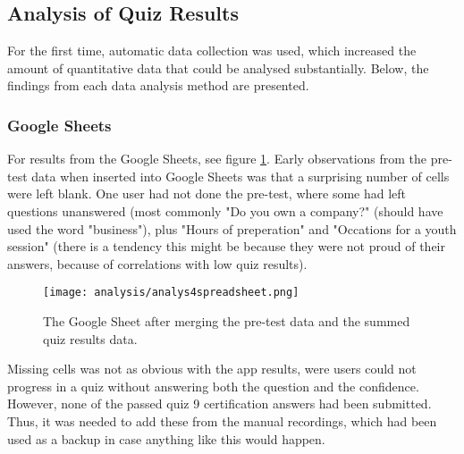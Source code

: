 \subsection{Analysis of Quiz Results}






For the first time, automatic data collection was used, which increased the amount of quantitative data that could be analysed substantially. Below, the findings from each data analysis method are presented.

\subsubsection{Google Sheets}
For results from the Google Sheets, see figure \ref{fig:analysFarg3}. Early observations from the pre-test data when inserted into Google Sheets was that a surprising number of cells were left blank. One user had not done the pre-test, where some had left questions unanswered (most commonly "Do you own a company?" (should have used the word "business"), plus "Hours of preperation" and "Occations for a youth session" (there is a tendency this might be because they were not proud of their answers, because of correlations with low quiz results).

\begin{figure}[h]
    \centering
    \texttt{[image: analysis/analys4spreadsheet.png]}
    \caption{The Google Sheet after merging the pre-test data and the summed quiz results data.}
    \label{fig:analysFarg3}
\end{figure}

Missing cells was not as obvious with the app results, were users could not progress in a quiz without answering both the question and the confidence. However, none of the passed quiz 9 certification answers had been submitted. Thus, it was needed to add these from the manual recordings, which had been used as a backup in case anything like this would happen.

